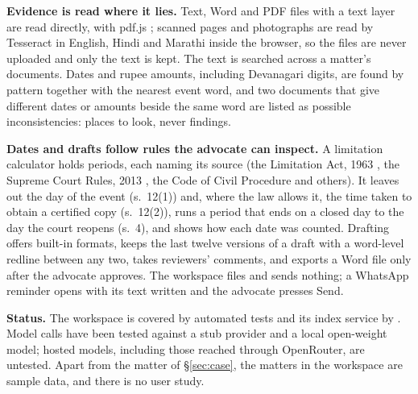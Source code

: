 \textbf{Evidence is read where it lies.} Text, Word and PDF files with a text layer are read directly, with pdf.js \cite{pdfjs}; scanned pages and photographs are read by Tesseract \cite{smith2007} in English, Hindi and Marathi inside the browser, so the files are never uploaded and only the text is kept. The text is searched across a matter's documents. Dates and rupee amounts, including Devanagari digits, are found by pattern together with the nearest event word, and two documents that give different dates or amounts beside the same word are listed as possible inconsistencies: places to look, never findings.

\textbf{Dates and drafts follow rules the advocate can inspect.} A limitation calculator holds \CasePeriods{} periods, each naming its source (the Limitation Act, 1963 \cite{limitationact}, the Supreme Court Rules, 2013 \cite{scrules}, the Code of Civil Procedure and others). It leaves out the day of the event (s.~12(1)) and, where the law allows it, the time taken to obtain a certified copy (s.~12(2)), runs a period that ends on a closed day to the day the court reopens (s.~4), and shows how each date was counted. Drafting offers \CaseFormats{} built-in formats, keeps the last twelve versions of a draft with a word-level redline between any two, takes reviewers' comments, and exports a Word file only after the advocate approves. The workspace files and sends nothing; a WhatsApp reminder opens with its text written and the advocate presses Send.

\textbf{Status.} The workspace is covered by \CaseTestsWorkspace{} automated tests and its index service by \CaseTestsApi{}. Model calls have been tested against a stub provider and a local open-weight model; hosted models, including those reached through OpenRouter, are untested. Apart from the matter of \S\ref{sec:case}, the matters in the workspace are sample data, and there is no user study.
